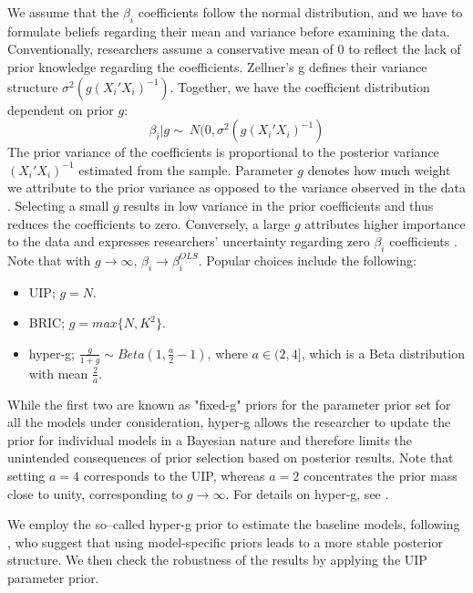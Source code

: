 We assume that the $\beta_{i}$ coefficients follow the normal distribution, and we have to formulate beliefs regarding their mean and variance before examining the data. Conventionally, researchers assume a conservative mean of 0 to reflect the lack of prior knowledge regarding the coefficients. Zellner's g defines their variance structure $\sigma^{2}(g(X_{i}'X_{i})^{-1})$. Together, we have the coefficient distribution dependent on prior $g$:
%
\begin{equation}
	\beta_{i}\vert g \sim\ N(0, \sigma^{2}(g(X_{i}'X_{i})^{-1}) 
\end{equation}
The prior variance of the coefficients is proportional to the posterior variance $(X_{i}'X_{i})^{-1}$ estimated from the sample. Parameter $g$ denotes how much weight we attribute to the prior variance as opposed to the variance observed in the data \citep{FeldkircherZeugner2009}. Selecting a small $g$ results in low variance in the prior coefficients and thus reduces the coefficients to zero. Conversely, a large $g$ attributes higher importance to the data and expresses researchers' uncertainty regarding zero $\beta_{i}$ coefficients \citep{Zeugner2011}. Note that with $g \rightarrow \infty$, $\beta_{i} \rightarrow \beta^{OLS}_{i}$. Popular choices include the following:
\begin{itemize}
	\item \ac{UIP}; $g = N$.
	\item \ac{BRIC}; $g = max\{N, K^{2}\}$.
	\item hyper-g; $\frac{g}{1+g} \sim Beta (1, \frac{a}{2} - 1)$, where $a \in (2,4]$, which is a Beta distribution with mean $\frac{2}{a}$.
\end{itemize}
%
While the first two are known as "fixed-g" priors for the parameter prior set for all the models under consideration, hyper-g allows the researcher to update the prior for individual models in a Bayesian nature and therefore limits the unintended consequences of prior selection based on posterior results. Note that setting $a=4$ corresponds to the \ac{UIP}, whereas $a=2$ concentrates the prior mass close to unity, corresponding to $g \rightarrow \infty$. For details on hyper-g, see \citet{Liangetal2008}.

We employ the so--called hyper-g prior to estimate the baseline models, following \citet{FeldkircherZeugner2009}, who suggest that using model-specific priors leads to a more stable posterior structure. We then check the robustness  of the results by applying the \ac{UIP} parameter prior.

